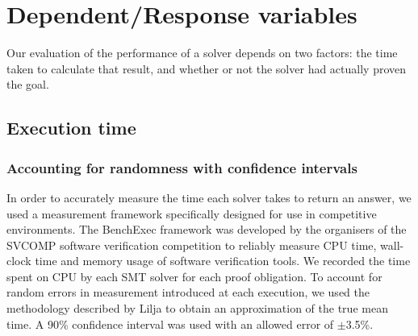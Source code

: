 

\section{Dependent/Response variables}
\label{sec:dependant}

Our evaluation of the performance of a solver depends on two factors: the time taken to calculate that result, and whether or not the solver had actually proven the goal.

\subsection{Execution time}
\subsubsection{Accounting for randomness with confidence intervals}

In order to accurately measure the time each solver takes to return an answer, we used a measurement framework specifically designed for use in competitive environments. The BenchExec \cite{benchexec} framework was developed by the organisers of the SVCOMP \cite{SVCOMP} software verification competition to reliably measure CPU time, wall-clock time and memory usage of software verification tools. We recorded the time spent on CPU by each SMT solver for each proof obligation. To account for random errors in measurement introduced at each execution, we used the methodology described by Lilja \cite{LiljaJ} to obtain an approximation of the true mean time. A 90\% confidence interval was used with an allowed error of $\pm$3.5\%.   




